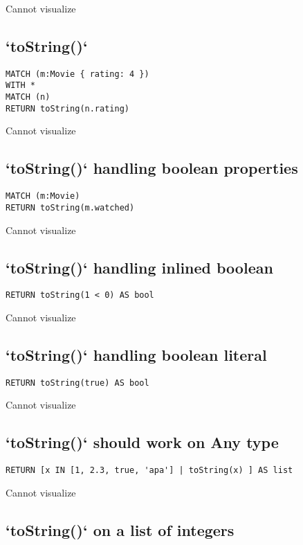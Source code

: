 Cannot visualize
\subsection{`toString()`}

\begin{lstlisting}
MATCH (m:Movie { rating: 4 })
WITH *
MATCH (n)
RETURN toString(n.rating)
\end{lstlisting}

Cannot visualize
\subsection{`toString()` handling boolean properties}

\begin{lstlisting}
MATCH (m:Movie)
RETURN toString(m.watched)
\end{lstlisting}

Cannot visualize
\subsection{`toString()` handling inlined boolean}

\begin{lstlisting}
RETURN toString(1 < 0) AS bool
\end{lstlisting}

Cannot visualize
\subsection{`toString()` handling boolean literal}

\begin{lstlisting}
RETURN toString(true) AS bool
\end{lstlisting}

Cannot visualize
\subsection{`toString()` should work on Any type}

\begin{lstlisting}
RETURN [x IN [1, 2.3, true, 'apa'] | toString(x) ] AS list
\end{lstlisting}

Cannot visualize
\subsection{`toString()` on a list of integers}

